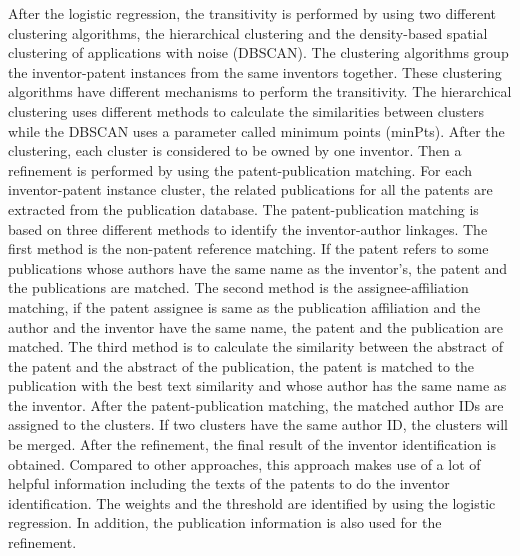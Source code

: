 After the logistic regression, the transitivity is performed by using two different clustering algorithms, the hierarchical clustering and the density-based spatial clustering of applications with noise (DBSCAN). The clustering algorithms group the inventor-patent instances from the same inventors together. These clustering algorithms have different mechanisms to perform the transitivity. The hierarchical clustering uses different methods to calculate the similarities between clusters while the DBSCAN uses a parameter called minimum points (minPts). After the clustering, each cluster is considered to be owned by one inventor. Then a refinement is performed by using the patent-publication matching. For each inventor-patent instance cluster, the related publications for all the patents are extracted from the publication database. The patent-publication matching is based on three different methods to identify the inventor-author linkages. The first method is the non-patent reference matching. If the patent refers to some publications whose authors have the same name as the inventor's, the patent and the publications are matched. The second method is the assignee-affiliation matching, if the patent assignee is same as the publication affiliation and the author and the inventor have the same name, the patent and the publication are matched. The third method is to calculate the similarity between the abstract of the patent and the abstract of the publication, the patent is matched to the publication with the best text similarity and whose author has the same name as the inventor. After the patent-publication matching, the matched author IDs are assigned to the clusters. If two clusters have the same author ID, the clusters will be merged. After the refinement, the final result of the inventor identification is obtained. Compared to other approaches, this approach makes use of a lot of helpful information including the texts of the patents to do the inventor identification. The weights and the threshold are identified by using the logistic regression. In addition, the publication information is also used for the refinement.


